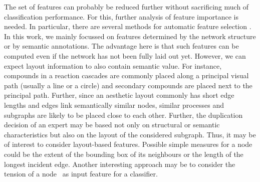 \documentclass[
	fontsize=10pt, %
	twoside=true, %
	secnumdepth=1, %
  toc=indentunnumbered %
]{kaobook}
\begin{document}

The set of features can probably be reduced further without sacrificing much of
classification performance. For this, further analysis of feature importance is
needed. In particular, there are several methods for automatic feature selection
\cite{chandrashekar_SurveyFeatureSelection_2014}. In this work, we mainly
focussed on features determined by the network structure or by semantic
annotations. The advantage here is that such features can be computed even if
the network has not been fully laid out yet.
%
However, we can expect layout information to also contain semantic value. For
instance, compounds in a reaction cascades are commonly placed along a principal
visual path (usually a line or a circle) and secondary compounds are placed next
to the principal path. Further, since an aesthetic layout commonly has short
edge lengths and edges link semantically similar nodes, similar processes and
subgraphs are likely to be placed close to each other. Further, the duplication
decision of an expert may be based not only on structural or semantic
characteristics but also on the layout of the considered subgraph.
%
Thus, it may be of interest to consider layout-based features. Possible simple
measures for a node could be the extent of the bounding box of its neighbours or
the length of the longest incident edge. Another interesting approach may be to
consider the tension of a node~\cite{eades_VertexSplittingTensionfree_1996} as
input feature for a classifier.
\end{document}
